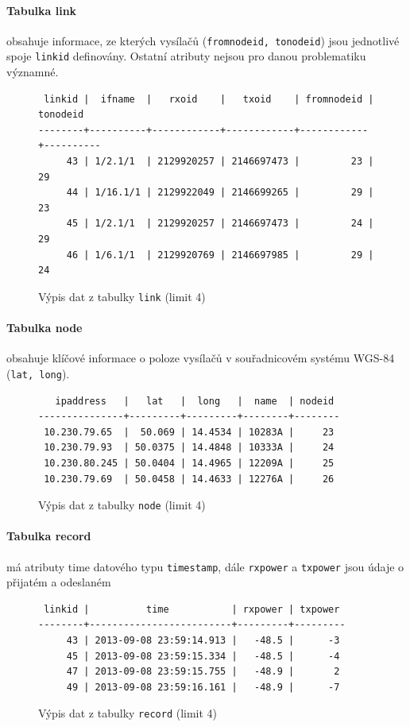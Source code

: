 \documentclass[a4paper,12pt,oneside]{report}
\begin{document}
\paragraph*{Tabulka link} obsahuje informace, ze kterých vysílačů (\texttt{fromnodeid, tonodeid}) jsou jednotlivé spoje \texttt{linkid} definovány. Ostatní atributy nejsou pro danou problematiku významné.

\begin{figure}[h!]
\centering
\footnotesize
\begin{BVerbatim}
 linkid |  ifname  |   rxoid    |   txoid    | fromnodeid | tonodeid 
--------+----------+------------+------------+------------+----------
     43 | 1/2.1/1  | 2129920257 | 2146697473 |         23 |       29
     44 | 1/16.1/1 | 2129922049 | 2146699265 |         29 |       23
     45 | 1/2.1/1  | 2129920257 | 2146697473 |         24 |       29
     46 | 1/6.1/1  | 2129920769 | 2146697985 |         29 |       24
\end{BVerbatim}
\caption{ Výpis dat z tabulky  \texttt{link} (limit 4) }
\end{figure}


\paragraph*{Tabulka node} obsahuje klíčové informace o poloze vysílačů v souřadnicovém systému WGS-84 (\texttt{lat, long}).

\begin{figure}[h!]
\centering
\footnotesize
\begin{BVerbatim}
   ipaddress   |   lat   |  long   |  name  | nodeid 
---------------+---------+---------+--------+--------
 10.230.79.65  |  50.069 | 14.4534 | 10283A |     23
 10.230.79.93  | 50.0375 | 14.4848 | 10333A |     24
 10.230.80.245 | 50.0404 | 14.4965 | 12209A |     25
 10.230.79.69  | 50.0458 | 14.4633 | 12276A |     26
\end{BVerbatim}
\caption{Výpis dat z tabulky  \texttt{node} (limit 4)}
\end{figure}

\paragraph*{Tabulka record} má atributy time datového typu \texttt{timestamp}, dále \texttt{rxpower} a \texttt{txpower} jsou údaje o přijatém a odeslaném 

\begin{figure}[h!]
\centering
\footnotesize
\begin{BVerbatim}
 linkid |          time           | rxpower | txpower 
--------+-------------------------+---------+---------
     43 | 2013-09-08 23:59:14.913 |   -48.5 |      -3
     45 | 2013-09-08 23:59:15.334 |   -48.5 |      -4
     47 | 2013-09-08 23:59:15.755 |   -48.9 |       2
     49 | 2013-09-08 23:59:16.161 |   -48.9 |      -7
\end{BVerbatim}
\caption{Výpis dat z tabulky \texttt{record} (limit 4) }
\end{figure}
\end{document}
